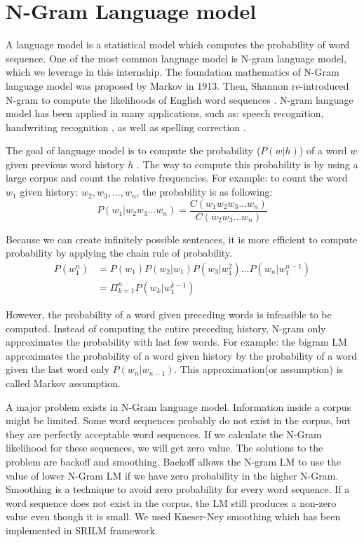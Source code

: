 \section{N-Gram Language model}


A language model is a statistical model which computes the probability of word sequence. One of the most common language model is N-gram language model, which we leverage in this internship. The foundation mathematics of N-Gram language model was proposed by Markov in 1913. Then, Shannon re-introduced N-gram to compute the likelihoods of English word sequences \cite{Shannon:2001:MTC:584091.584093}. N-gram language model has been applied in many applications, such as: speech recognition\cite{Woodland2015}, handwriting recognition \cite{Poznanski2016}, as well as spelling correction \cite{Kukich1992}.

The goal of language model is to compute the probability ($P(w|h)$) of a word $w$ given previous word history $h$ . The way to compute this probability is by using a large corpus and count the relative frequencies. For example: to count the word $w_{1}$ given history: $w_{2}, w_{3}, ..., w_{n}$, the probability is as following:
\begin{equation}
P(w_{1}|w_{2}w_{3}...w_{n})= \frac{C(w_{1}w_{2}w_{3}...w_{n})}{C(w_{2}w_{3}...w_{n})}
\end{equation}

Because we can create infinitely possible sentences, it is more efficient to compute probability by applying the chain rule of probability. 
\begin{align*}
P(w_{1}^{n}) & =P(w_{1})P(w_{2}|w_{1})P(w_{3}|w_{1}^{2})...P(w_{n}|w_{1}^{n-1}) \\
& = \Pi_{k=1}^{n} P(w_{k}|w_{1}^{k-1})
\end{align*}

However, the probability of a word given preceding words is infeasible to be computed. Instead of computing the entire preceding history, N-gram only approximates the probability with last few words. For example: the bigram LM approximates the probability of a word given history by the probability of a word given the last word only $P(w_{n}|w_{n-1})$.  This approximation(or assumption) is called Markov assumption.

A major problem exists in N-Gram language model. Information inside a corpus might be limited. Some word sequences probably do not exist in the corpus, but they are perfectly acceptable word sequences. If we calculate the N-Gram likelihood for these sequences, we will get zero value. The solutions to the problem are backoff and smoothing. Backoff allows the N-gram LM to use the value of lower N-Gram LM if we have zero probability in the higher N-Gram.  Smoothing is a technique to avoid  zero probability for every word sequence. If a word sequence does not exist in the corpus, the LM still produces a non-zero value even though it is small. We used Kneser-Ney smoothing \cite{KneserNey1993} which has been implemented in SRILM framework.

